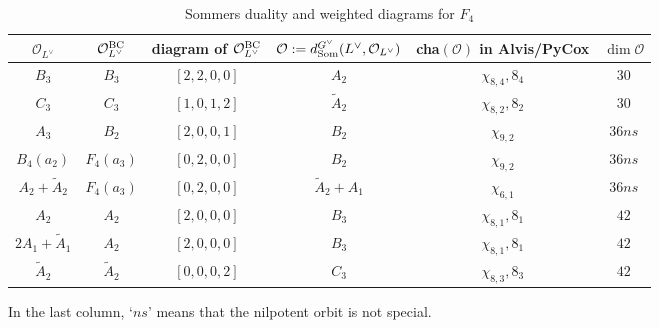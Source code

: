 \documentclass[reqno,12pt]{amsart}
\numberwithin{equation}{section}
\theoremstyle{plain}
\theoremstyle{definition}
\begin{document}
\begin{table}[htbp]\caption{Sommers duality and weighted diagrams for $ F_4$ }
	\label{tabcharf4}
	\centering
	\renewcommand{\arraystretch}{1.3}
	\setlength\tabcolsep{5pt}
\small{	\begin{tabular}{|c|c|c|c|c|c|}
		\hline $\mathcal{O}_{L^\vee}$  & $\mathcal{O}_{L^\vee}^{\rm BC} $ & diagram of $\mathcal{O}_{L^\vee}^{\rm BC} $ &$\mathcal{O}:=d_{\rm Som}^{G^\vee}(L^\vee, \mathcal{O}_{L^\vee})$ &  cha$(\mathcal{O})$ in Alvis/PyCox &  $\dim \mathcal{O}$ \\ \hline

$B_3$
& $B_3$ & $[2,2,0,0]$& $A_2$  & $\chi_{8,4},8_4$  &  $30$ \\
$C_3$
&$C_3$ & $[1,0,1,2]$&$\tilde{A}_2$  & $\chi_{8,2},8_2$  &   $30$ \\
\hline

$A_3$
& $B_2$ &$[2,0,0,1] $&$B_2$  &  $\chi_{9,2}$  &   $36ns$ \\
$B_4(a_2)$
& $F_4(a_3)$ & $[0,2,0,0]$  & $B_2$  & $\chi_{9,2}$  &   $36ns$ \\
$A_2+\tilde{A}_2$
& $F_4(a_3)$ & $[0,2,0,0]$  & $\tilde{A}_2+A_1$  & $\chi_{6,1}$  &   $36ns$ \\
\hline


$A_2$
& $A_2$ & $[2,0,0,0]$ & $B_3$  & $\chi_{8,1},8_1$  &   $42$ \\
$2A_1+\tilde{A}_1$
&$A_2$ & $[2,0,0,0]$&  $B_3$  &$\chi_{8,1},8_1$  &   $42$ \\
$\tilde{A}_2$
& $\tilde{A}_2$ & $[0,0,0,2]$& $C_3$  &  $\chi_{8,3},8_3$  & $42$ \\


\hline

\hline

\end{tabular}}
	\bigskip
 
 In the last column,    `$ns$' means that the nilpotent orbit is not special.		

\end{table}
\end{document}
